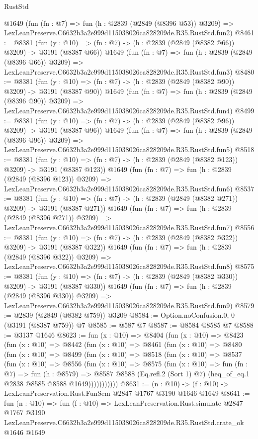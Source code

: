 \begin{lexlean}{RustStd}
\begin{coremodule}
    @1649
    (fun (fn : @7) =>
    fun (h : @2839 (@2849 (@8396 @53)) @3209) =>
    LexLeanPreserve.C6632b3a2e999d115038026ca828209de.R35.RustStd.fun2)
@8461 := @8381
    (fun (y : @10) => (fn : @7) -> (h : @2839 (@2849 (@8382 @66)) @3209) -> @3191 (@8387 @66))
    @1649
    (fun (fn : @7) =>
    fun (h : @2839 (@2849 (@8396 @66)) @3209) =>
    LexLeanPreserve.C6632b3a2e999d115038026ca828209de.R35.RustStd.fun3)
@8480 := @8381
    (fun (y : @10) => (fn : @7) -> (h : @2839 (@2849 (@8382 @90)) @3209) -> @3191 (@8387 @90))
    @1649
    (fun (fn : @7) =>
    fun (h : @2839 (@2849 (@8396 @90)) @3209) =>
    LexLeanPreserve.C6632b3a2e999d115038026ca828209de.R35.RustStd.fun4)
@8499 := @8381
    (fun (y : @10) => (fn : @7) -> (h : @2839 (@2849 (@8382 @96)) @3209) -> @3191 (@8387 @96))
    @1649
    (fun (fn : @7) =>
    fun (h : @2839 (@2849 (@8396 @96)) @3209) =>
    LexLeanPreserve.C6632b3a2e999d115038026ca828209de.R35.RustStd.fun5)
@8518 := @8381
    (fun (y : @10) => (fn : @7) -> (h : @2839 (@2849 (@8382 @123)) @3209) -> @3191 (@8387 @123))
    @1649
    (fun (fn : @7) =>
    fun (h : @2839 (@2849 (@8396 @123)) @3209) =>
    LexLeanPreserve.C6632b3a2e999d115038026ca828209de.R35.RustStd.fun6)
@8537 := @8381
    (fun (y : @10) => (fn : @7) -> (h : @2839 (@2849 (@8382 @271)) @3209) -> @3191 (@8387 @271))
    @1649
    (fun (fn : @7) =>
    fun (h : @2839 (@2849 (@8396 @271)) @3209) =>
    LexLeanPreserve.C6632b3a2e999d115038026ca828209de.R35.RustStd.fun7)
@8556 := @8381
    (fun (y : @10) => (fn : @7) -> (h : @2839 (@2849 (@8382 @322)) @3209) -> @3191 (@8387 @322))
    @1649
    (fun (fn : @7) =>
    fun (h : @2839 (@2849 (@8396 @322)) @3209) =>
    LexLeanPreserve.C6632b3a2e999d115038026ca828209de.R35.RustStd.fun8)
@8575 := @8381
    (fun (y : @10) => (fn : @7) -> (h : @2839 (@2849 (@8382 @330)) @3209) -> @3191 (@8387 @330))
    @1649
    (fun (fn : @7) =>
    fun (h : @2839 (@2849 (@8396 @330)) @3209) =>
    LexLeanPreserve.C6632b3a2e999d115038026ca828209de.R35.RustStd.fun9)
@8579 := @2839 (@2849 (@8382 @759)) @3209
@8584 := Option.noConfusion.{0, 0} (@3191 (@8387 @759)) @7
@8585 := @587 @7
@8587 := @8584 @8585 @7
@8588 := @3137 @1646
@8623 := fun (x : @10) =>
  @8404
    (fun (x : @10) =>
    @8423
      (fun (x : @10) =>
      @8442
        (fun (x : @10) =>
        @8461
          (fun (x : @10) =>
          @8480
            (fun (x : @10) =>
            @8499
              (fun (x : @10) =>
              @8518
                (fun (x : @10) =>
                @8537
                  (fun (x : @10) =>
                  @8556
                    (fun (x : @10) =>
                    @8575
                      (fun (x : @10) =>
                      fun (fn : @7) =>
                      fun (h : @8579) =>
                      @8587
                        @8588
                        (Eq.refl.{2} (Sort 1) @7)
                        (heq_of_eq.{1} @2838 @8585 @8588 @1649)))))))))))
@8631 := (n : @10) -> (f : @10) -> LexLeanPreservation.Rust.FunSem @2847 @1767 @3190 @1646 @1649
@8641 := fun (n : @10) =>
  fun (f : @10) =>
  LexLeanPreservation.Rust.simulate
    @2847
    @1767
    @3190
    LexLeanPreserve.C6632b3a2e999d115038026ca828209de.R35.RustStd.crate_ok
    @1646
    @1649
\end{coremodule}
\end{lexlean}
